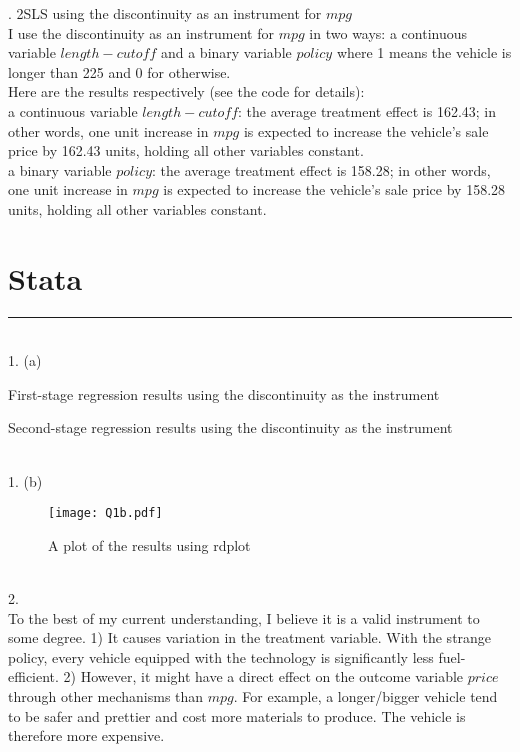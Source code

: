 \documentclass{article}
\begin{document}
. 2SLS using the discontinuity as an instrument for $mpg$
\\ I use the discontinuity as an instrument for $mpg$ in two ways: a continuous variable $length - cutoff$ and a binary variable $policy$ where 1 means the vehicle is longer than 225 and 0 for otherwise.
\smallskip
\\ Here are the results respectively (see the code for details): 
\\ a continuous variable $length - cutoff$: the average treatment effect is 162.43; in other words, one unit increase in $mpg$ is expected to increase the vehicle's sale price by 162.43 units, holding all other variables constant.
\\ a binary variable $policy$: the average treatment effect is 158.28; in other words, one unit increase in $mpg$ is expected to increase the vehicle's sale price by 158.28 units, holding all other variables constant.

\section{Stata}
\rule{17cm}{0.4pt}
\smallskip
\\ 1. (a)
\begin{table}[H]
    \centering
    
    \caption{First-stage regression results using the discontinuity as the instrument}
    \label{tab:Q1a}
\end{table}
\noindent
\begin{table}[H]
    \centering
    
    \caption{Second-stage regression results using the discontinuity as the instrument}
    \label{tab:Q1b}
\end{table}
\bigskip
\noindent
\\ 1. (b)
\begin{figure}[H]
    \centering
    \texttt{[image: Q1b.pdf]}
    \caption{A plot of the results using rdplot}
    \label{fig:Q1b}
\end{figure}
\bigskip
\noindent
\\ 2.
\\ To the best of my current understanding, I believe it is a valid instrument to some degree. 1) It causes variation in the treatment variable. With the strange policy, every vehicle equipped with the technology is significantly less fuel-efficient. 2) However, it might have a direct effect on the outcome variable $price$ through other mechanisms than $mpg$. For example, a longer/bigger vehicle tend to be safer and prettier and cost more materials to produce. The vehicle is therefore more expensive.  
\end{document}
